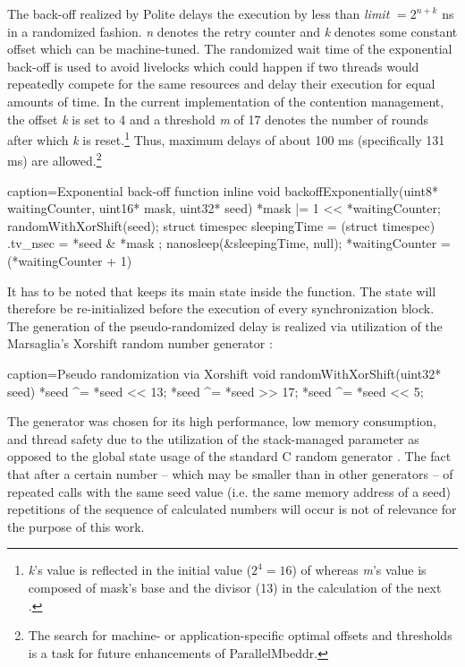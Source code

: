 The back-off realized by Polite delays the execution  by less than \textit{limit} $ = 2^{n+k}$ ns \cite{AdvancedContentionManagement} in a randomized fashion. \textit{n} denotes the retry counter and \textit{k} denotes some constant offset which can be machine-tuned. The randomized wait time of the exponential back-off is used to avoid livelocks which could happen if two threads would repeatedly compete for the same resources and delay their execution for equal amounts of time. In the current implementation  of the contention management, the offset \textit{k} is set to 4 and a threshold \textit{m} of 17 denotes the number of rounds after which \textit{k} is reset.\footnote{\textit{k}'s value is reflected in the initial value ($2^4 = 16$) of  whereas \textit{m}'s value is composed of mask's base and the divisor (13) in the calculation of the next .} Thus, maximum delays of about 100 ms (specifically 131 ms) are allowed.\footnote{The search for machine- or application-specific optimal offsets and thresholds is a task for future enhancements of ParallelMbeddr.}
\begin{ccode}{caption=Exponential back-off function}
inline void backoffExponentially(uint8* waitingCounter, uint16* mask, uint32* seed) { 
  *mask |= 1 << *waitingCounter; 
  randomWithXorShift(seed); 
  struct timespec sleepingTime = (struct timespec){ .tv_nsec = *seed & *mask }; 
  nanosleep(&sleepingTime, null); 
  *waitingCounter = (*waitingCounter + 1) %
}
\end{ccode}
It has to be noted that  keeps its main state inside the  function. The state will therefore be re-initialized before the execution of every synchronization block. The generation of the pseudo-randomized delay is realized via utilization of the Marsaglia's Xorshift random number generator \cite{XorshiftRngs}:
\begin{ccode}{caption=Pseudo randomization via Xorshift}
void randomWithXorShift(uint32* seed) { 
  *seed ^= *seed << 13; 
  *seed ^= *seed >> 17; 
  *seed ^= *seed << 5; 
}
\end{ccode}
The generator was chosen for its high performance, low memory consumption, and thread safety due to the utilization of the stack-managed  parameter as opposed to the global state usage of the standard C random generator . The fact that after a certain number -- which may be smaller than in other generators -- of repeated calls with the same seed value (i.e. the same memory address of a seed) repetitions of the sequence of calculated numbers will occur is not of relevance for the purpose of this work.

